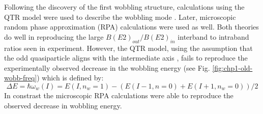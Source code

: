 Following the discovery of the first wobbling structure, calculations using the QTR model were used to describe the wobbling mode \cite{oldQTRWobblingTheory1,oldQTRWobblingTheory2,oldQTRWobblingTheory3,oldQTRWobblingTheory4}. Later, microscopic random phase approximation (RPA) calculations \cite{wobblingRPAMatsuzaki,wobblingRPAMatsuzaki2,wobblingRPAOi,wobblingRPAShimizu,wobblingRPAshoji} were used as well. Both theories do well in reproducing the large $B(E2)_{out}/B(E2)_{in}$ interband to intraband ratios seen in experiment. However, the QTR model, using the assumption that the odd quasiparticle aligns with the intermediate axis \cite{oldQTRWobblingTheory1,oldQTRWobblingTheory2,oldQTRWobblingTheory3,oldQTRWobblingTheory4}, fails to reproduce the experimentally observed decrease in the wobbling energy (see Fig. \ref{fig:chp1-old-wobb-freq}) which is defined by:
\begin{equation}
\label{eqn:chp4-wobb-freq}
\Delta{}E=\hbar\omega_w(I)=E(I,n_w=1)-(E(I-1,n=0)+E(I+1,n_w=0))/2
\end{equation}
In constrast the microscopic RPA calculations were able to reproduce the observed decrease in wobbling energy.
